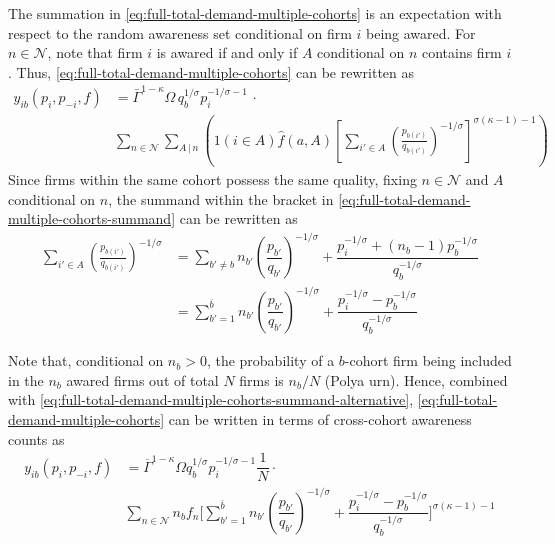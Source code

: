\documentclass[12pt]{article}
\begin{document}
The summation in \cref{eq:full-total-demand-multiple-cohorts} is an expectation with respect to the random awareness set conditional on firm $i$ being awared. For $n \in \mathcal{N}$, note that firm $i$ is awared if and only if $A$ conditional on $n$ contains firm $i$. Thus, \cref{eq:full-total-demand-multiple-cohorts} can be rewritten as
\begin{align}
y_{ib}(p_i, p_{-i}, f)  &= \bar{\Gamma}^{1-\kappa}\Omega \, q_b^{1/\sigma}p_i^{-1/\sigma - 1}\, \cdot \\ 
& \sum_{n \in \mathcal{N} }  \sum_{{A}\,|\,n}\left( 1( i \in A ) \hat{f}(a,A)\left[\sum_{i'\in A}\left( \frac{p_{b(i')}}{q_{b(i')}}\right)^{-1/\sigma}\right]^{\sigma (\kappa - 1)-1}\right)\label{eq:full-total-demand-multiple-cohorts-summand}
\end{align}
Since firms within the same cohort possess the same quality, fixing $n \in \mathcal{N}$ and $A$ conditional on $n$, the summand within the bracket in \cref{eq:full-total-demand-multiple-cohorts-summand} can be rewritten as 
\begin{align}
\sum_{i'\in A}\left( \frac{p_{b(i')}}{q_{b(i')}}\right)^{-1/\sigma} &= \sum_{b' \neq b } n_{b'} \left( \dfrac{p_{b'}}{q_{b'}}  \right)^{-1/\sigma} +   
\dfrac{p_i^{-1/\sigma} + (n_b-1) p^{-1/\sigma}_{b} }{ q_b^{-1/\sigma }} \\
&= \sum_{b' =1 }^{\bar{b}} n_{b'} \left( \dfrac{p_{b'}}{q_{b'}}  \right)^{-1/\sigma} +   
\dfrac{p_i^{-1/\sigma}   - p^{-1/\sigma}_{b} }{{ q_b^{-1/\sigma }}} \label{eq:full-total-demand-multiple-cohorts-summand-alternative}
\end{align}


Note that, conditional on $n_b > 0$, the probability of a $b$-cohort firm being included in the $n_b$ awared firms out of total $N$ firms is $n_b /N$ (Polya urn). Hence, combined with \cref{eq:full-total-demand-multiple-cohorts-summand-alternative},  \cref{eq:full-total-demand-multiple-cohorts} can be written in terms of cross-cohort awareness counts as
\begin{align}
y_{ib}(p_i, p_{-i}, f) 
&=  \overline{\Gamma}^{1 - \kappa} \Omega q_b^{1/\sigma} p_i^{-1/\sigma-1} \dfrac{1}{N} \cdot \\ 
&\sum_{ n \in \mathcal{N} } n_b f_n \Bigg[ \sum_{b' =1 }^{\bar{b}} n_{b'} \left( \dfrac{p_{b'}}{q_{b'}}  \right)^{-1/\sigma} +   
\dfrac{p_i^{-1/\sigma}   - p^{-1/\sigma}_{b}}{{ q_b^{-1/\sigma }}}  \Bigg]^{\sigma(\kappa-1) -1}
\end{align}
\end{document}
